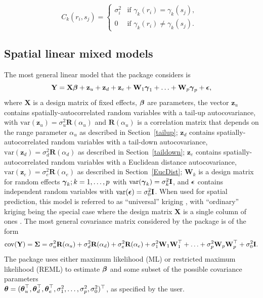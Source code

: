 \documentclass[nojss]{jss}
\def\btheta{\mbox{\boldmath $\theta$}}
\def\bbeta{\mbox{\boldmath $\beta$}}
\def\bgamma{\mbox{\boldmath $\gamma$}}
\def\bepsilon{\mbox{\boldmath $\epsilon$}}
\def\bSigma{\mbox{\boldmath $\Sigma$}}
\def\bY{\textbf{Y}}
\def\bX{\textbf{X}}
\def\bR{\textbf{R}}
\def\bz{\textbf{z}}
\def\bW{\textbf{W}}
\def\bI{\textbf{I}}
\def\var{\textrm{var}}
\def\cov{\textrm{cov}}
\begin{document}
\begin{equation}
  C_{k}(r_i,s_j)= \left\{ \begin{array}{ll}
      \sigma_i^2 &
      \textrm{if $\gamma_k(r_i) = \gamma_k(s_j)$}, \\
      0 &
      \textrm{if $\gamma_k(r_i) \neq \gamma_k(s_j).$ }
    \end{array} \right.
\end{equation}


\subsection{Spatial linear mixed models} \label{sec:SpatialLinearMixedModels}

The most general linear model that the  package considers is
\begin{equation} \label{eq:spLinearModel}
\bY = \bX\bbeta + \bz_u + \bz_d +\bz_e + \bW_1\bgamma_1 + \ldots
+ \bW_p\bgamma_p + \bepsilon,
\end{equation}
where $\bX$ is a design matrix of fixed effects, $\bbeta$ are
parameters, the vector $\bz_u$ contains spatially-autocorrelated
random variables with a tail-up autocovariance, with $\var(\bz_u) =
\sigma_u^2\bR(\alpha_u)$ and $\bR(\alpha_u)$ is a correlation matrix
that depends on the range parameter $\alpha_u$ as described in
Section~\ref{tailup}; $\bz_d$ contains spatially-autocorrelated random
variables with a tail-down autocovariance, $\var(\bz_d) =
\sigma_d^2\bR(\alpha_d)$ as described in Section~\ref{taildown};
$\bz_e$ contains spatially-autocorrelated random variables with a
Euclidean distance autocovariance, $\var(\bz_e) =
\sigma_e^2\bR(\alpha_e)$ as described in Section~\ref{EucDist};
$\bW_k$ is a design matrix for random effects $\bgamma_k; k =
1,\ldots,p$ with $\var(\bgamma_k)=\sigma^2_k\bI$, and $\bepsilon$
contains independent random variables with
$\var(\bepsilon)=\sigma^2_0\bI$.  When used for spatial prediction,
this model is referred to as ``universal'' kriging
\citep*[p. 107]{Le:Zide:stat:2006} , with ``ordinary'' kriging being
the special case where the design matrix \textbf{X} is a single column
of ones \citep[p. 119]{Cres:stat:1993}. The most general covariance
matrix considered by the  package is of the form
\begin{equation} \label{eq:covStructure}
\cov(\bY)=\bSigma=\sigma_u^2\bR(\alpha_u) + \sigma_d^2\bR(\alpha_d) +
\sigma_e^2\bR(\alpha_e) + \sigma_1^2\bW_1\bW_1^\top + \ldots +
\sigma_p^2\bW_p\bW_p^\top + \sigma_0^2\bI.  \end{equation} The
 package uses either maximum likelihood (ML) or restricted
maximum likelihood (REML) to estimate $\bbeta$ and some subset of the
possible covariance parameters \\
$\btheta=(\btheta_u^\top,\btheta_d^\top, \btheta_e^\top, \sigma^2_1,
\ldots, \sigma^2_p, \sigma^2_0)^\top$, as specified by the user.
\end{document}
